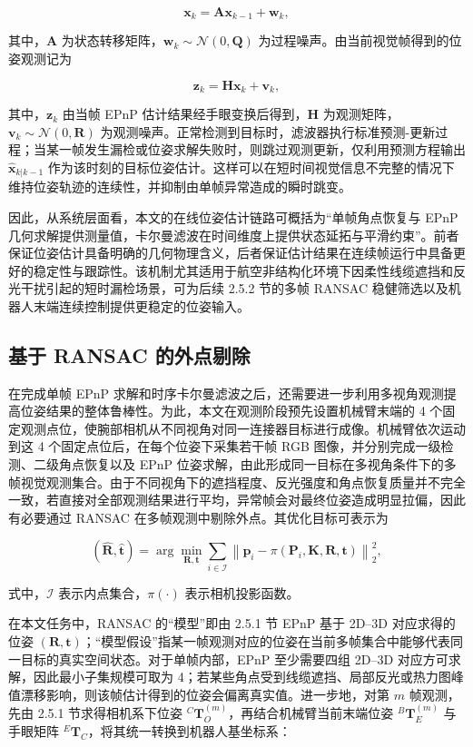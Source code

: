 $$
\mathbf{x}_{k}=\mathbf{A}\mathbf{x}_{k-1}+\mathbf{w}_{k},
$$

其中，\(\mathbf{A}\) 为状态转移矩阵，\(\mathbf{w}_{k}\sim\mathcal{N}(0,\mathbf{Q})\) 为过程噪声。由当前视觉帧得到的位姿观测记为

$$
\mathbf{z}_{k}=\mathbf{H}\mathbf{x}_{k}+\mathbf{v}_{k},
$$

其中，\(\mathbf{z}_{k}\) 由当帧 EPnP 估计结果经手眼变换后得到，\(\mathbf{H}\) 为观测矩阵，\(\mathbf{v}_{k}\sim\mathcal{N}(0,\mathbf{R})\) 为观测噪声。正常检测到目标时，滤波器执行标准预测-更新过程；当某一帧发生漏检或位姿求解失败时，则跳过观测更新，仅利用预测方程输出 \(\hat{\mathbf{x}}_{k|k-1}\) 作为该时刻的目标位姿估计。这样可以在短时间视觉信息不完整的情况下维持位姿轨迹的连续性，并抑制由单帧异常造成的瞬时跳变。

因此，从系统层面看，本文的在线位姿估计链路可概括为“单帧角点恢复与 EPnP 几何求解提供测量值，卡尔曼滤波在时间维度上提供状态延拓与平滑约束”。前者保证位姿估计具备明确的几何物理含义，后者保证估计结果在连续帧运行中具备更好的稳定性与跟踪性。该机制尤其适用于航空非结构化环境下因柔性线缆遮挡和反光干扰引起的短时漏检场景，可为后续 2.5.2 节的多帧 RANSAC 稳健筛选以及机器人末端连续控制提供更稳定的位姿输入。

\subsection{基于 RANSAC 的外点剔除}
在完成单帧 EPnP 求解和时序卡尔曼滤波之后，还需要进一步利用多视角观测提高位姿结果的整体鲁棒性。为此，本文在观测阶段预先设置机械臂末端的 4 个固定观测点位，使腕部相机从不同视角对同一连接器目标进行成像。机械臂依次运动到这 4 个固定点位后，在每个位姿下采集若干帧 RGB 图像，并分别完成一级检测、二级角点恢复以及 EPnP 位姿求解，由此形成同一目标在多视角条件下的多帧视觉观测集合。由于不同视角下的遮挡程度、反光强度和角点恢复质量并不完全一致，若直接对全部观测结果进行平均，异常帧会对最终位姿造成明显拉偏，因此有必要通过 RANSAC 在多帧观测中剔除外点。其优化目标可表示为

$$
(\hat{\mathbf{R}},\hat{\mathbf{t}})=\arg\min_{\mathbf{R},\mathbf{t}}\sum_{i\in\mathcal{I}}\left\|\mathbf{p}_i-\pi(\mathbf{P}_i,\mathbf{K},\mathbf{R},\mathbf{t})\right\|_2^2,
$$

式中，\(\mathcal{I}\) 表示内点集合，\(\pi(\cdot)\) 表示相机投影函数。

在本文任务中，RANSAC 的“模型”即由 2.5.1 节 EPnP 基于 2D–3D 对应求得的位姿 \((\mathbf{R},\mathbf{t})\)；“模型假设”指某一帧观测对应的位姿在当前多帧集合中能够代表同一目标的真实空间状态。对于单帧内部，EPnP 至少需要四组 2D–3D 对应方可求解，因此最小子集规模可取为 4；若某些角点受到线缆遮挡、局部反光或热力图峰值漂移影响，则该帧估计得到的位姿会偏离真实值。进一步地，对第 \(m\) 帧观测，先由 2.5.1 节求得相机系下位姿 \({}^{C}\mathbf{T}_{O}^{(m)}\)，再结合机械臂当前末端位姿 \({}^{B}\mathbf{T}_{E}^{(m)}\) 与手眼矩阵 \({}^{E}\mathbf{T}_{C}\)，将其统一转换到机器人基坐标系：

